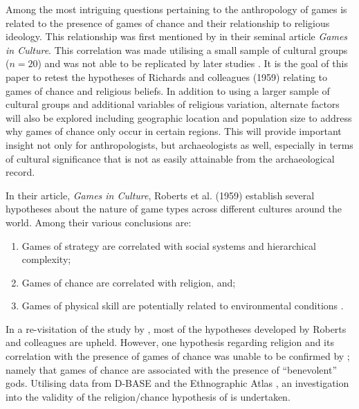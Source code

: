\documentclass[%
	]{ijsra}
\begin{document}
Among the most intriguing questions pertaining to the anthropology of games is related to the presence of games of chance and their relationship to religious ideology. This relationship was first mentioned by \textcite{richards1959} in their seminal article \textit{Games in Culture}. This correlation was made utilising a small sample of cultural groups ($n = 20$) and was not able to be replicated by later studies \parencite[e.g.][]{chick1998}. It is the goal of this paper to retest the hypotheses of Richards and colleagues (1959) relating to games of chance and religious beliefs. In addition to using a larger sample of cultural groups and additional variables of religious variation, alternate factors will also be explored including geographic location and population size to address why games of chance only occur in certain regions. This will provide important insight not only for anthropologists, but archaeologists as well, especially in terms of cultural significance that is not as easily attainable from the archaeological record.


In their article, \textit{Games in Culture}, Roberts et al. (1959) establish several hypotheses about the nature of game types across different cultures around the world. Among their various conclusions are:

\begin{enumerate}
\item Games of strategy are correlated with social systems and hierarchical complexity;
\item Games of chance are correlated with religion, and;
\item Games of physical skill are potentially related to environmental conditions \parencite[604]{roberts1959}.
\end{enumerate}

In a re-visitation of the study by \textcite{chick1998}, most of the hypotheses developed by Roberts and colleagues are upheld. However, one hypothesis regarding religion and its correlation with the presence of games of chance was unable to be confirmed by \textcite[192]{chick1998}; namely that games of chance are associated with the presence of ``benevolent” gods. Utilising data from D-BASE and the Ethnographic Atlas \parencites{murdock1962}{barry1980}{gray1999}{korotayev2004}{bondarenko2005}, an investigation into the validity of the religion/chance hypothesis of \textcite{roberts1959} is undertaken.
\end{document}
